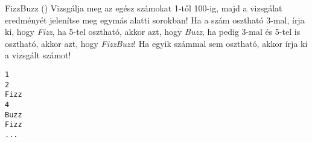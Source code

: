 \begin{frame}[fragile]
    \begin{exampleblock}{FizzBuzz ()}
        Vizsgálja meg az egész számokat 1-től 100-ig, majd a vizsgálat eredményét jelenítse meg egymás alatti sorokban! Ha a szám osztható 3-mal, írja ki, hogy \emph{Fizz}, ha 5-tel osztható, akkor azt, hogy \emph{Buzz}, ha pedig 3-mal és 5-tel is osztható, akkor azt, hogy \emph{FizzBuzz}! Ha egyik számmal sem osztható, akkor írja ki a vizsgált számot!\\
        \begin{verbatim}
1
2
Fizz
4
Buzz
Fizz
...
\end{verbatim}
    \end{exampleblock}
\end{frame}
